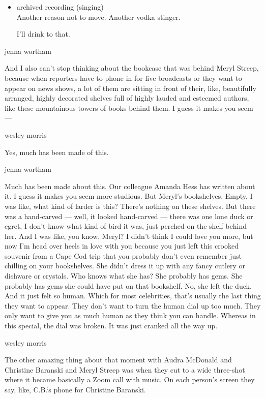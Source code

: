 \begin{itemize}
\item
  archived recording (singing)\\
  Another reason not to move. Another vodka stinger.

  I'll drink to that.
\end{itemize}

jenna wortham

And I also can't stop thinking about the bookcase that was behind Meryl
Streep, because when reporters have to phone in for live broadcasts or
they want to appear on news shows, a lot of them are sitting in front of
their, like, beautifully arranged, highly decorated shelves full of
highly lauded and esteemed authors, like these mountainous towers of
books behind them. I guess it makes you seem ---

wesley morris

Yes, much has been made of this.

jenna wortham

Much has been made about this. Our colleague Amanda Hess has written
about it. I guess it makes you seem more studious. But Meryl's
bookshelves. Empty. I was like, what kind of larder is this? There's
nothing on these shelves. But there was a hand-carved --- well, it
looked hand-carved --- there was one lone duck or egret, I don't know
what kind of bird it was, just perched on the shelf behind her. And I
was like, you know, Meryl? I didn't think I could love you more, but now
I'm head over heels in love with you because you just left this crooked
souvenir from a Cape Cod trip that you probably don't even remember just
chilling on your bookshelves. She didn't dress it up with any fancy
cutlery or dishware or crystals. Who knows what she has? She probably
has gems. She probably has gems she could have put on that bookshelf.
No, she left the duck. And it just felt so human. Which for most
celebrities, that's usually the last thing they want to appear. They
don't want to turn the human dial up too much. They only want to give
you as much human as they think you can handle. Whereas in this special,
the dial was broken. It was just cranked all the way up.

wesley morris

The other amazing thing about that moment with Audra McDonald and
Christine Baranski and Meryl Streep was when they cut to a wide
three-shot where it became basically a Zoom call with music. On each
person's screen they say, like, C.B.`s phone for Christine Baranski.

